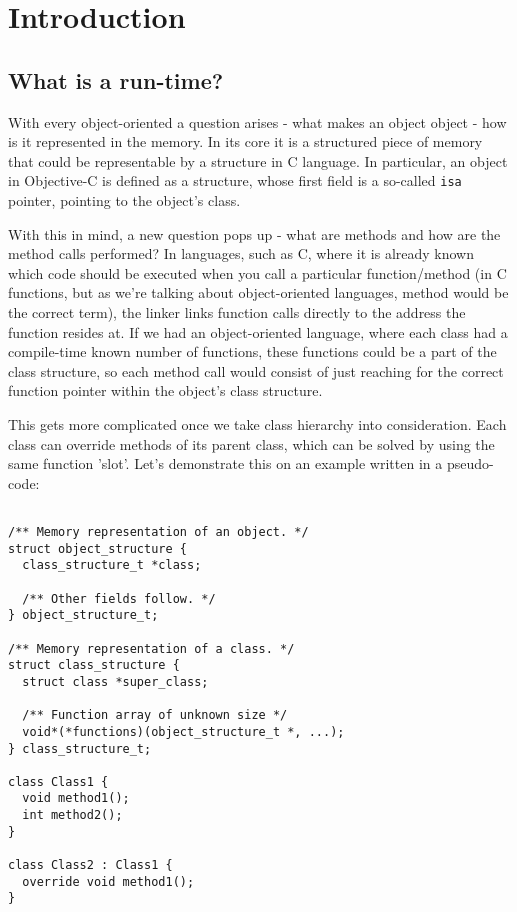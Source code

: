 \chapter*{Introduction}

\section{What is a run-time?}

With every object-oriented a question arises - what makes an object object - how is it represented in the memory. In its core it is a structured piece of memory that could be representable by a structure in C language. In particular, an object in Objective-C is defined as a structure, whose first field is a so-called \verb=isa= pointer, pointing to the object's class.

With this in mind, a new question pops up - what are methods and how are the method calls performed? In languages, such as C, where it is already known which code should be executed when you call a particular function/method (in C functions, but as we're talking about object-oriented languages, method would be the correct term), the linker links function calls directly to the address the function resides at. If we had an object-oriented language, where each class had a compile-time known number of functions, these functions could be a part of the class structure, so each method call would consist of just reaching for the correct function pointer within the object's class structure.

This gets more complicated once we take class hierarchy into consideration. Each class can override methods of its parent class, which can be solved by using the same function 'slot'. Let's demonstrate this on an example written in a pseudo-code:

\begin{verbatim}

/** Memory representation of an object. */
struct object_structure {
  class_structure_t *class;
  
  /** Other fields follow. */
} object_structure_t;

/** Memory representation of a class. */
struct class_structure {
  struct class *super_class;
  
  /** Function array of unknown size */
  void*(*functions)(object_structure_t *, ...);
} class_structure_t;

class Class1 {
  void method1();
  int method2();
}

class Class2 : Class1 {
  override void method1();
}
  
\end{verbatim}

